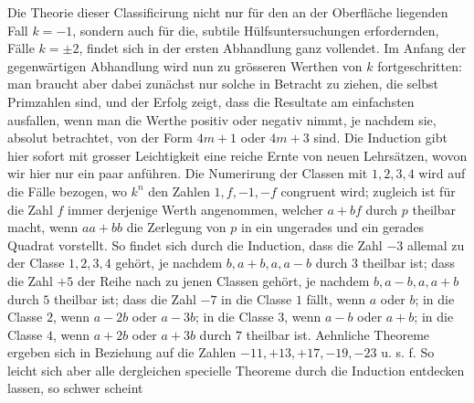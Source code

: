 Die Theorie dieser Classificirung nicht nur für den an der Oberfläche liegenden Fall $k=-1$, sondern auch für die, subtile Hülfsuntersuchungen erfordernden, Fälle $k=\pm2$, findet sich in der ersten Abhandlung ganz vollendet. Im Anfang der gegenwärtigen Abhandlung wird nun zu grösseren Werthen von $k$ fortgeschritten: man braucht aber dabei zunächst nur solche in Betracht zu ziehen, die selbst Primzahlen sind, und der Erfolg zeigt, dass die Resultate am einfachsten ausfallen, wenn man die Werthe positiv oder negativ nimmt, je nachdem sie, absolut betrachtet, von der Form $4m+1$ oder $4m+3$ sind. Die Induction gibt hier sofort mit grosser Leichtigkeit eine reiche Ernte von neuen Lehrsätzen, wovon wir hier nur ein paar anführen. Die Numerirung der Classen mit $1,2,3,4$ wird auf die Fälle bezogen, wo $k^n$ den Zahlen $1,f,-1,-f$ congruent wird; zugleich ist für die Zahl $f$ immer derjenige Werth angenommen, welcher $a+bf$ durch $p$ theilbar macht, wenn $aa+bb$ die Zerlegung von $p$ in ein ungerades und ein gerades Quadrat vorstellt. So findet sich durch die Induction, dass die Zahl $-3$ allemal zu der Classe $1,2,3,4$ gehört, je nachdem $b,a+b,a,a-b$ durch $3$ theilbar ist; dass die Zahl $+5$ der Reihe nach zu jenen Classen gehört, je nachdem $b,a-b,a,a+b$ durch $5$ theilbar ist; dass die Zahl $-7$ in die Classe $1$ fällt, wenn $a$ oder $b$; in die Classe $2$, wenn $a-2b$ oder $a-3b$; in die Classe $3$, wenn $a-b$ oder $a+b$; in die Classe $4$, wenn $a+2b$ oder $a+3b$ durch $7$ theilbar ist. Aehnliche Theoreme ergeben sich in Beziehung auf die Zahlen $-11,+13,+17,-19,-23$ u. s. f. So leicht sich aber alle dergleichen specielle Theoreme durch die Induction entdecken lassen, so schwer scheint
